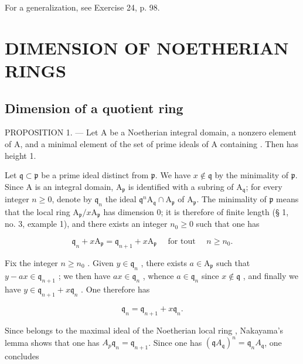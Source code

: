 For a generalization, see Exercise 24, p. 98.

\section{DIMENSION OF NOETHERIAN RINGS}

\subsection{Dimension of a quotient ring}

PROPOSITION 1. --- Let A be a Noetherian integral domain,  a nonzero element of A, and  a minimal element of the set of prime ideals of A containing . Then  has height 1.

Let \(\mathfrak{q} \subset \mathfrak{p}\) be a prime ideal distinct from \(\mathfrak{p}\). We have \(x \notin \mathfrak{q}\) by the minimality of \(\mathfrak{p}\). Since A is an integral domain, \(\mathrm{A}_{\mathfrak{p}}\) is identified with a subring of \(\mathrm{A}_{\mathfrak{q}}\); for every integer \(n \geqslant 0\), denote by \(\mathfrak{q}_n\) the ideal \(\mathfrak{q}^n\mathrm{A}_{\mathfrak{q}} \cap \mathrm{A}_{\mathfrak{p}}\) of \(\mathrm{A}_{\mathfrak{p}}\). The minimality of \(\mathfrak{p}\) means that the local ring \(\mathrm{A}_{\mathfrak{p}} / x\mathrm{A}_{\mathfrak{p}}\) has dimension 0; it is therefore of finite length (§ 1, no. 3, example 1), and there exists an integer \(n_0 \geqslant 0\) such that one has

\[
\mathfrak {q} _ {n} + x \mathrm{A} _ {\mathfrak {p}} = \mathfrak {q} _ {n + 1} + x \mathrm{A} _ {\mathfrak {p}} \quad \text { for   tout } \quad n \geqslant n _ {0}.\tag{1}
\]

Fix the integer \(n \geqslant n_{0}\) . Given \(y \in \mathfrak{q}_{n}\) , there exists \(a \in \mathrm{A}_{\mathfrak{p}}\) such that \(y - ax \in \mathfrak{q}_{n+1}\) ; we then have \(ax \in \mathfrak{q}_{n}\) , whence \(a \in \mathfrak{q}_{n}\) since \(x \notin \mathfrak{q}\) , and finally we have \(y \in \mathfrak{q}_{n+1} + x\mathfrak{q}_{n}\) . One therefore has

\[
\mathfrak {q} _ {n} = \mathfrak {q} _ {n + 1} + x \mathfrak {q} _ {n}.\tag{2}
\]

Since  belongs to the maximal ideal of the Noetherian local ring , Nakayama's lemma shows that one has \(A_{p}\)\(\mathfrak{q}_n = \mathfrak{q}_{n+1}\). Since one has \((\mathfrak{q}A_{\mathfrak{q}})^{n} = \mathfrak{q}_{n}A_{\mathfrak{q}}\), one concludes

